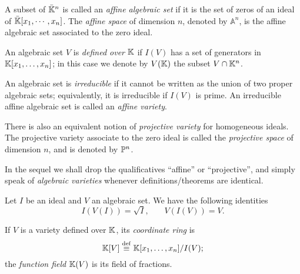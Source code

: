  A subset of $\bar{\mathbb{K}}^n$ is called an
\textit{affine algebraic set} if it is the
set of zeros of an ideal of $\bar{\mathbb{K}}[x_1,\cdots,x_n]$.  The
\textit{affine space} of dimension $n$, denoted by
$\mathbb{A}^n$, is the affine algebraic set associated to the zero
ideal.

An algebraic set $V$ is
\textit{defined over} $\mathbb{K}$
if $I(V)$ has a set of generators in $\mathbb{K}[x_1,\ldots,x_n]$; in this
case we denote by $V(\mathbb{K})$ the subset $V\cap\mathbb{K}^n$.

An algebraic set is
\textit{irreducible} if it cannot be
written as the union of two proper algebraic sets; equivalently, it is
irreducible if $I(V)$ is prime. An irreducible affine algebraic set is
called an \textit{affine variety}.

There is also an equivalent notion of
\textit{projective variety} for homogeneous
ideals. The projective variety associate to the zero ideal is called
the \textit{projective space} of dimension $n$,
and is denoted by $\mathbb{P}^n$.

In the sequel we shall drop the qualificatives ``affine'' or
``projective'', and simply speak of
\textit{algebraic varieties} whenever
definitions/theorems are identical.


\begin{theorem}[Nullstellensatz]
  Let $I$ be an ideal and $V$ an algebraic set. We have the following
  identities
  \begin{equation}
    \label{eq:217}
    I(V(I)) = \sqrt{I}
    \text{,}\qquad
    V(I(V)) = V
    \text{.}
  \end{equation}
\end{theorem}

If $V$ is a variety defined over $\mathbb{K}$, its
\textit{coordinate
  ring} is
\begin{equation}
  \label{eq:218}
  \mathbb{K}[V] \overset{\mathrm{def}}{\equiv} \mathbb{K}[x_1,\ldots,x_n]/I(V)
  \text{;}
\end{equation}
the \textit{function field}
$\mathbb{K}(V)$ is its field of fractions. 

